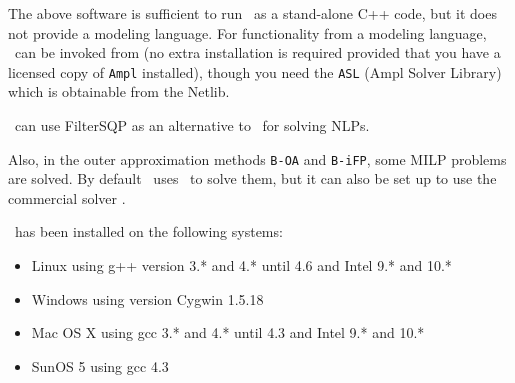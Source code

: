 The above software is sufficient to run \Bonmin\ as a
stand-alone C++ code, but it does not provide a modeling language.
For functionality from a modeling language, \Bonmin\ can be
invoked from  (no extra installation is required provided
that you have a licensed copy of {\tt Ampl} installed), though you
need the {\tt ASL} (Ampl Solver Library) which is obtainable from the Netlib.

\Bonmin\ can use FilterSQP  as an alternative to \Ipopt\ for solving NLPs.

Also, in the outer approximation methods {\tt B-OA} and {\tt B-iFP}, some MILP problems are
solved. By default \Bonmin\ uses  \Cbc\ to solve them, but it can also be set up to use
the commercial solver .

\Bonmin\ has been installed on the following systems:
\begin{itemize}
\item Linux using g++ version 3.* and 4.* until 4.6 and Intel 9.* and 10.*
\item Windows using version Cygwin 1.5.18
\item Mac OS X using gcc 3.* and 4.* until 4.3 and Intel 9.* and 10.*
\item SunOS 5 using gcc 4.3
\end{itemize}

